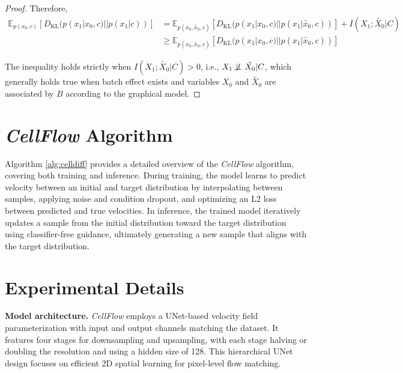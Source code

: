 \begin{proof}
Therefore, 
\begin{equation}
    \begin{split}
    \mathbb{E}_{p(x_0, c)}\left[ D_{\text{KL}}(p(x_1|x_0,c)||p(x_1|c)) \right] &= \mathbb{E}_{p(x_0, \tilde{x_0}, c)}\left[ D_{\text{KL}}(p(x_1|x_0,c)||p(x_1|\tilde{x_0},c)) \right] + I(X_1;\tilde{X_0}|C) \nonumber\\
    &\geq \mathbb{E}_{p(x_0, \tilde{x_0}, c)}\left[ D_{\text{KL}}(p(x_1|x_0,c)||p(x_1|\tilde{x_0},c)) \right] 
    \end{split}
\end{equation}

The inequality holds strictly when $I(X_1;\tilde{X_0}|C)>0$, i.e., $X_1\not\!\perp\!\!\!\perp \tilde{X_0}|C$, which generally holds true when batch effect exists and variables $X_0$ and $\tilde{X_0}$ are associated by $B$ according to the graphical model.

\end{proof}


\newpage
\section{\emph{CellFlow} Algorithm}
\label{sec:algorithm}


Algorithm \ref{alg:celldiff} provides a detailed overview of the \emph{CellFlow} algorithm, covering both training and inference. During training, the model learns to predict velocity between an initial and target distribution by interpolating between samples, applying noise and condition dropout, and optimizing an L2 loss between predicted and true velocities. In inference, the trained model iteratively updates a sample from the initial distribution toward the target distribution using classifier-free guidance, ultimately generating a new sample that aligns with the target distribution.

\section{Experimental Details}
\label{sec:experimental}

\textbf{Model architecture.} \emph{CellFlow} employs a UNet-based velocity field parameterization with input and output channels matching the dataset. It features four stages for downsampling and upsampling, with each stage halving or doubling the resolution and using a hidden size of 128. This hierarchical UNet design focuses on efficient 2D spatial learning for pixel-level flow matching.

